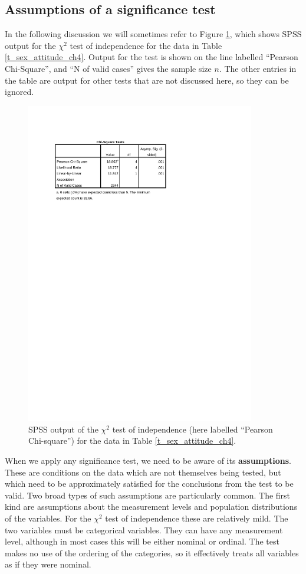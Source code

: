 \subsection{Assumptions of a significance test}
\label{ss_tables_chi2test_ass}

In the following discussion we will sometimes refer to Figure
\ref{f_spsschi2}, which shows SPSS output for the $\chi^{2}$ test of
independence for the data in Table \ref{t_sex_attitude_ch4}. Output for
the test is shown on the line labelled ``Pearson Chi-Square'', and ``N
of valid cases'' gives the sample size $n$. The other entries in the
table are output for other tests that are not discussed here, so they
can be ignored.

\begin{figure}
\caption{SPSS output of the $\chi^{2}$ test of independence (here labelled
``Pearson Chi-square'') for the data in Table \ref{t_sex_attitude_ch4}.}
\label{f_spsschi2}
\begin{center}
\includegraphics[width=100mm]{chi2test_ess}

\end{center}
\end{figure}


When we apply any significance test, we need to be aware of its
\textbf{assumptions}. These are conditions on the data which are not
themselves being tested, but which need to be approximately satisfied
for the conclusions from the test to be valid. Two broad types of such
assumptions are particularly common. The first kind are assumptions
about the measurement levels and population distributions of the
variables. For the $\chi^{2}$ test of independence these are relatively
mild. The two variables must be categorical variables. They can have any
measurement level, although in most cases this will be either nominal or
ordinal. The test makes no use of the ordering of the categories, so it
effectively treats all variables as if they were nominal.


